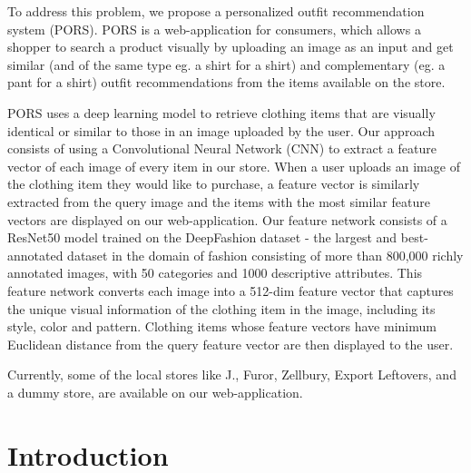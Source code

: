 \documentclass[12pt]{report}
\begin{document}
To address this problem, we propose a personalized outfit recommendation system (PORS). PORS is a web-application for consumers, which allows a shopper to search a product visually by uploading an image as an input and get similar (and of the same type eg. a shirt for a shirt) and complementary (eg. a pant for a shirt) outfit recommendations from the items available on the store.\newline

PORS uses a deep learning model to retrieve clothing items that are visually identical or similar to those in an image uploaded by the user. Our approach consists of using a Convolutional Neural Network (CNN) to extract a feature vector of each image of every item in our store. When a user uploads an image of the clothing item they would like to purchase, a feature vector is similarly extracted from the query image and the items with the most similar feature vectors are displayed on our web-application. Our feature network consists of a ResNet50 model trained on the DeepFashion dataset - the largest and best-annotated dataset in the domain of fashion consisting of more than 800,000 richly annotated images, with 50 categories and 1000 descriptive attributes. This feature network converts each image into a 512-dim feature vector that captures the unique visual information of the clothing item in the image, including its style, color and pattern. Clothing items whose feature vectors have minimum Euclidean distance from the query feature vector are then displayed to the user. \newline

Currently, some of the local stores like J., Furor, Zellbury, Export Leftovers, and a dummy store, are available on our web-application. 

\tableofcontents
\listoffigures
\listoftables


\chapter{Introduction}
\label{chap:intro}

\end{document}
